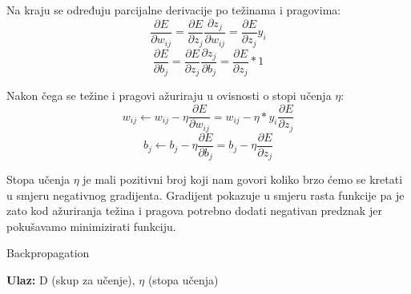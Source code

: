 \documentclass[times, utf8, zavrsni, numeric]{fer}
\begin{document}
Na kraju se određuju parcijalne derivacije po težinama i pragovima:
\begin{equation}\label{eq:der-w}
\dfrac{\partial E}{\partial w_{ij}} = \dfrac{\partial E}{\partial z_j}\dfrac{\partial z_j}{\partial w_{ij}} = \dfrac{\partial E}{\partial z_j}y_i
\end{equation}
\begin{equation}\label{eq:der-b}
\dfrac{\partial E}{\partial b_j} = \dfrac{\partial E}{\partial z_j}\dfrac{\partial z_j}{\partial b_j} = \dfrac{\partial E}{\partial z_j}*1
\end{equation}

Nakon čega se težine i pragovi ažuriraju u ovisnosti o stopi učenja $\eta$:
\begin{equation}\label{eq:azuriraj-w}
w_{ij} \leftarrow w_{ij} - \eta\dfrac{\partial E}{\partial w_{ij}} = w_{ij} - \eta * y_i  \dfrac{\partial E}{\partial z_j}
\end{equation}
\begin{equation}\label{eq:azuriraj-b}
b_{j} \leftarrow b_{j} - \eta\dfrac{\partial E}{\partial b_{j}} = b_{j} - \eta \dfrac{\partial E}{\partial z_j}
\end{equation}

Stopa učenja $\eta$ je mali pozitivni broj koji nam govori koliko brzo ćemo se kretati u smjeru negativnog gradijenta. Gradijent pokazuje u smjeru rasta funkcije pa je zato kod ažuriranja težina i pragova potrebno dodati negativan predznak jer pokušavamo minimizirati funkciju.

\begin{algorithm}
\caption{Backpropagation}
\label{alg:backpropagation}
\begin{algorithmic}
\STATE \textbf{Ulaz:} D (skup za učenje), $\eta$ (stopa učenja)
\ENDFOR
\ENDFOR
\ENDWHILE
\end{algorithmic}
\end{algorithm}
\end{document}

